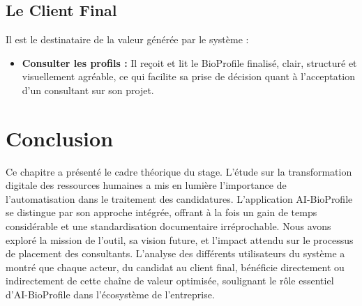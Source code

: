 \subsection{Le Client Final}
Il est le destinataire de la valeur générée par le système :
\begin{itemize}
    \item \textbf{Consulter les profils :} Il reçoit et lit le BioProfile finalisé, clair, structuré et visuellement agréable, ce qui facilite sa prise de décision quant à l'acceptation d'un consultant sur son projet.
\end{itemize}


\section{Conclusion}
Ce chapitre a présenté le cadre théorique du stage. L'étude sur la transformation digitale des ressources humaines a mis en lumière l'importance de l'automatisation dans le traitement des candidatures. L'application AI-BioProfile se distingue par son approche intégrée, offrant à la fois un gain de temps considérable et une standardisation documentaire irréprochable. Nous avons exploré la mission de l'outil, sa vision future, et l'impact attendu sur le processus de placement des consultants. L'analyse des différents utilisateurs du système a montré que chaque acteur, du candidat au client final, bénéficie directement ou indirectement de cette chaîne de valeur optimisée, soulignant le rôle essentiel d'AI-BioProfile dans l'écosystème de l'entreprise.